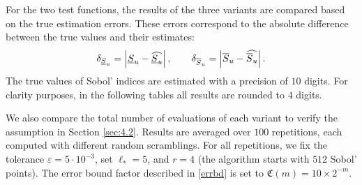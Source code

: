 For the two test functions, the results of the three variants are compared based on the true estimation errors. These errors correspond to the absolute difference between the true values and their estimates:
$$\delta_{\underline{S}_u} = \left\lvert\underline{S}_u - \widehat{\underline{S}_u}\right\rvert, \qquad \delta_{\overline{S}_u} = \left\lvert\overline{S}_u - \widehat{\overline{S}_u}\right\rvert.$$
{\color{purple} The true values of Sobol' indices are estimated with a precision of $10$ digits. For clarity purposes, in the following tables all results are rounded to $4$ digits.}  

We also compare the total number of evaluations of each variant to verify the assumption in Section \ref{sec:4.2}. {\color{purple}  Results are averaged over $100$ repetitions, each computed with different random scramblings}. For all repetitions, we fix the tolerance $\varepsilon=5\cdot 10^{-3}$, set $\ell_*=5$, and $r=4$ (the algorithm starts with $512$ Sobol' points). The error bound factor described in \eqref{errbd} is set to $\mathfrak{C}(m)=10\times 2^{-m}$.




%

